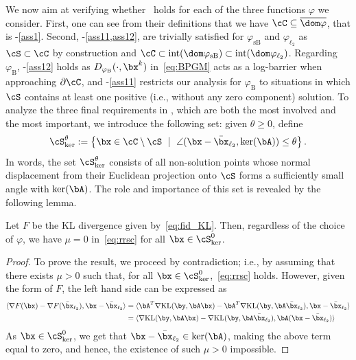 \documentclass[11pt]{amsart}
\begin{document}
We now aim at verifying whether~ holds for each of the three functions $\varphi$ we consider. First, one can see from their definitions that we  have $\cC\subseteq\overline{\dom\varphi}$, that is -\ref{ass1}. Second, -\cref{ass11,ass12}, are trivially satisfied for $\varphi_{\mathrm{sB}}$ and $\varphi_{\ell_2}$ as $\cS \subset \cC$ by construction and $\cC\subset \mathrm{int}(\dom \varphi_{\mathrm{sB}}) \subset \mathrm{int}(\dom \varphi_{\ell_2})$. Regarding $\varphi_\mathrm{B}$, -\ref{ass12} holds as $D_{\varphi_\mathrm{B}}(\cdot, \bx^k)$ in~\eqref{eq:BPGM} acts as a log-barrier when approaching $\partial \cC$, and -\ref{ass11} restricts our analysis for $\varphi_\mathrm{B}$ to situations in which $\cS$ contains at least one  positive (i.e., without any zero component) solution. To analyze the three final requirements in , which are both the most involved and the most important, we introduce the following set: given $\theta\geq0$, define
\begin{equation}\label{eq:Skerperp}
    \cS_{\ker}^{\theta}
    :=  \left\{
        \bx \in \cC \setminus \cS
        \ \mid \
        \angle(\bx - \bar \bx_{\ell_2},\ker(\bA))\leq\theta
    \right\}. 
\end{equation}
In words, the set $\cS_{\ker}^{\theta}$ consists of all non-solution points whose normal displacement from their Euclidean projection onto $\cS$ forms a sufficiently small angle with $\ker(\bA)$.
The role and importance of this set is revealed by the following lemma.
\begin{lemma}\label{lem:necessary condition}
  Let $F$ be the KL divergence given by~\cref{eq:fid_KL}. Then, regardless of the choice of $\varphi$, we have $\mu = 0$ in~\eqref{eq:rrsc} for all $\bx \in \cS^0_{\ker}$.
\end{lemma}
\begin{proof} To prove the result, we proceed by contradiction; i.e., by assuming that there exists $\mu>0$ such that, for all $\bx\in \cS^0_{\ker}$,~\eqref{eq:rrsc} holds. However, given the form of $F$, the left hand side can be expressed as
$$
\begin{aligned}
\langle \nabla F(\bx)-\nabla F(\bar\bx_{\ell_2}), \bx-\bar\bx_{\ell_2}\rangle 
&= 
\langle \bA^T\nabla \mathrm{KL}(\by,\bA\bx)- \bA^T\nabla \mathrm{KL}(\by,\bA\bar\bx_{\ell_2}),\bx-\bar\bx_{\ell_2} \rangle\\
&=
\langle \nabla \mathrm{KL}(\by,\bA\bx)- \nabla \mathrm{KL}(\by,\bA\bar\bx_{\ell_2}),\bA(\bx-\bar\bx_{\ell_2}) \rangle
\end{aligned}
$$
As $\bx\in \cS^0_{\ker}$, we get that $\bx-\bar\bx_{\ell_2}\in\ker(\bA)$, making the above term equal to zero, and hence, the existence of such $\mu>0$ impossible.
\end{proof}
\end{document}
